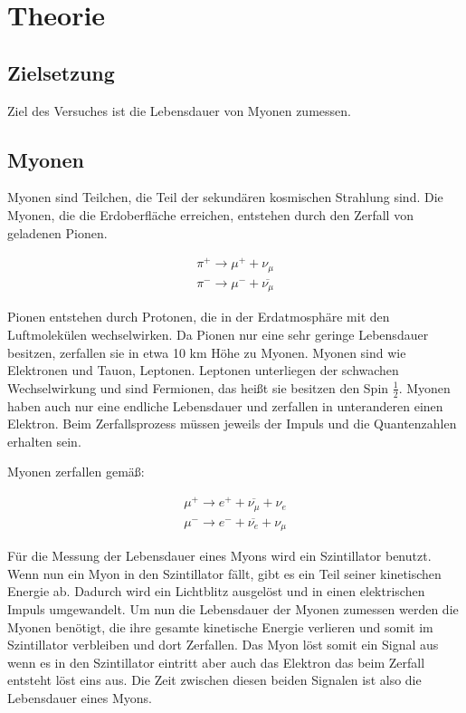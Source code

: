 \section{Theorie}
\label{sec:Theorie}

\subsection{Zielsetzung}
Ziel des Versuches ist die Lebensdauer von Myonen zumessen.

\subsection{Myonen}
Myonen sind Teilchen, die Teil der sekundären kosmischen Strahlung sind. Die Myonen, die die Erdoberfläche erreichen, 
entstehen durch den Zerfall von geladenen Pionen. 

\begin{align*}
    \pi ^+ \to \mu^+ + \nu_{\mu} \\
    \pi ^- \to \mu^- + \overline{\nu_{\mu}}
\end{align*}

\noindent Pionen entstehen durch Protonen,
die in der Erdatmosphäre mit den Luftmolekülen wechselwirken. Da Pionen nur eine sehr geringe Lebensdauer besitzen, zerfallen sie 
in etwa 10 km Höhe zu Myonen.
Myonen sind wie Elektronen und Tauon, Leptonen. Leptonen unterliegen der schwachen Wechselwirkung und sind Fermionen, 
das heißt sie besitzen den Spin $\frac{1}{2}$.
Myonen haben auch nur eine endliche Lebensdauer und zerfallen in unteranderen einen Elektron.
Beim Zerfallsprozess müssen jeweils der Impuls und die Quantenzahlen erhalten sein.

\noindent Myonen zerfallen gemäß: 

\begin{align*}
    \mu ^+ \to e^+ + \overline{\nu_{\mu}} +\nu_{e} \\
    \mu ^- \to e^- + \overline{\nu_{e}} + \nu_{\mu}
\end{align*}


\noindent Für die Messung der Lebensdauer eines Myons wird ein Szintillator benutzt.  Wenn nun ein Myon in den Szintillator fällt, gibt es ein Teil seiner 
kinetischen Energie ab. Dadurch wird ein Lichtblitz ausgelöst und in einen elektrischen Impuls umgewandelt. 
Um nun die Lebensdauer der Myonen zumessen werden die Myonen benötigt, die ihre gesamte kinetische Energie verlieren und somit im Szintillator verbleiben und dort Zerfallen.
Das Myon löst somit ein Signal aus wenn es in den Szintillator eintritt aber auch das Elektron das beim Zerfall entsteht löst eins aus.
Die Zeit zwischen diesen beiden Signalen ist also die Lebensdauer eines Myons.

